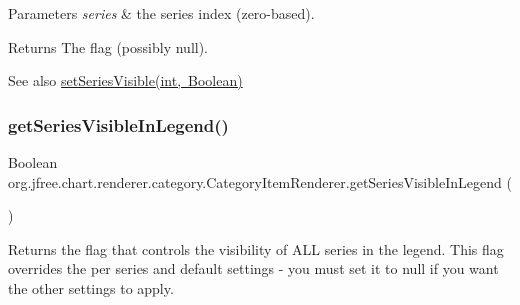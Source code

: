 \begin{DoxyParams}{Parameters}
{\em series} & the series index (zero-\/based).\\
\hline
\end{DoxyParams}
\begin{DoxyReturn}{Returns}
The flag (possibly {\ttfamily null}).
\end{DoxyReturn}
\begin{DoxySeeAlso}{See also}
\mbox{\hyperlink{interfaceorg_1_1jfree_1_1chart_1_1renderer_1_1category_1_1_category_item_renderer_a929d5c0d5de37983ac3f83b31b3f2abe}{set\+Series\+Visible(int, Boolean)}} 
\end{DoxySeeAlso}
\mbox{\label{interfaceorg_1_1jfree_1_1chart_1_1renderer_1_1category_1_1_category_item_renderer_a702f01f7f6b883405e393e74ea16a129}} 
\subsubsection{\texorpdfstring{get\+Series\+Visible\+In\+Legend()}{getSeriesVisibleInLegend()}\hspace{0.1cm}{\footnotesize\ttfamily [1/2]}}
{\footnotesize\ttfamily Boolean org.\+jfree.\+chart.\+renderer.\+category.\+Category\+Item\+Renderer.\+get\+Series\+Visible\+In\+Legend (\begin{DoxyParamCaption}{ }\end{DoxyParamCaption})}

Returns the flag that controls the visibility of A\+LL series in the legend. This flag overrides the per series and default settings -\/ you must set it to {\ttfamily null} if you want the other settings to apply.

